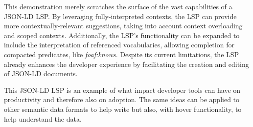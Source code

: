 \documentclass[
]{ceurart}
\begin{document}
This demonstration merely scratches the surface of the vast capabilities of a JSON-LD LSP.
By leveraging fully-interpreted contexts, the LSP can provide more contextually-relevant suggestions, taking into account context overloading and scoped contexts. 
Additionally, the LSP's functionality can be expanded to include the interpretation of referenced vocabularies, allowing completion for compacted predicates, like \textit{foaf:knows}.
Despite its current limitations, the LSP already enhances the developer experience by facilitating the creation and editing of JSON-LD documents.

This JSON-LD LSP is an example of what impact developer tools can have on productivity and therefore also on adoption.
The same ideas can be applied to other semantic data formats to help write but also, with hover functionality, to help understand the data. 


\end{document}
